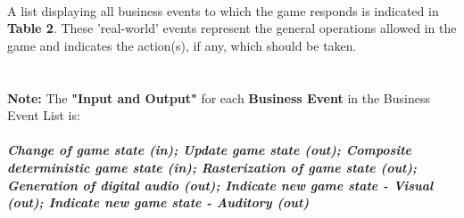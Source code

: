 \documentclass[12pt, titlepage]{article}
\begin{document}
\paragraph{}A list displaying all business events to which the game responds is indicated in \textbf{Table 2}. These 'real-world' events represent the general operations allowed in the game and indicates the action(s), if any, which should be taken.
\\
\\
\\ \textbf{Note:} The \textbf{"Input and Output"} for each \textbf{Business Event} in the Business Event List is:
\\
\\ \textbf{\emph{Change of game state (in); Update game state (out); Composite deterministic game state (in);  Rasterization of game state (out); Generation of digital audio (out); Indicate new game state - Visual (out); Indicate new game state - Auditory (out)}}
\\
\end{document}
